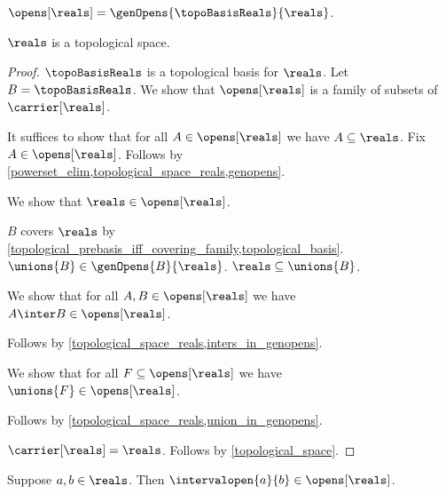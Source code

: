 \begin{axiom}\label{topological_space_reals}
    $\opens[\reals] = \genOpens{\topoBasisReals}{\reals}$.
\end{axiom}

\begin{theorem}\label{reals_is_topological_space}
    $\reals$ is a topological space.
\end{theorem}
\begin{proof}
    $\topoBasisReals$ is a topological basis for $\reals$.
    Let $B = \topoBasisReals$.
    We show that $\opens[\reals]$ is a family of subsets of $\carrier[\reals]$.
    \begin{subproof}
        It suffices to show that for all $A \in \opens[\reals]$ we have $A \subseteq \reals$.
        Fix $A \in \opens[\reals]$.
        Follows by \cref{powerset_elim,topological_space_reals,genopens}.
    \end{subproof}
    We show that $\reals \in\opens[\reals]$.
    \begin{subproof}
        $B$ covers $\reals$ by \cref{topological_prebasis_iff_covering_family,topological_basis}.
        $\unions{B} \in \genOpens{B}{\reals}$.
        $\reals \subseteq \unions{B}$.
    \end{subproof}
    We show that for all $A, B\in \opens[\reals]$ we have $A\inter B\in\opens[\reals]$.
    \begin{subproof}
        Follows by \cref{topological_space_reals,inters_in_genopens}.
    \end{subproof}
    We show that for all $F\subseteq \opens[\reals]$ we have $\unions{F}\in\opens[\reals]$.
    \begin{subproof}
        Follows by \cref{topological_space_reals,union_in_genopens}.
    \end{subproof}
    $\carrier[\reals] = \reals$.
    Follows by \cref{topological_space}.
\end{proof}

\begin{proposition}\label{open_interval_is_open}
    Suppose $a,b \in \reals$.
    Then $\intervalopen{a}{b} \in \opens[\reals]$.
\end{proposition}